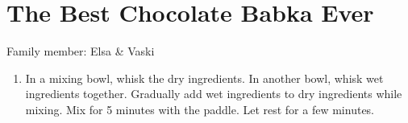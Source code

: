 \chapter{The Best Chocolate Babka Ever}
\label{ch:babka}



Family member: Elsa \& Vaski

\begin{enumerate}
    \item In a mixing bowl, whisk the dry ingredients. In another bowl, whisk wet ingredients together. Gradually add wet ingredients to dry ingredients while mixing. Mix for 5 minutes with the paddle. Let rest for a few minutes.
\end{enumerate}



